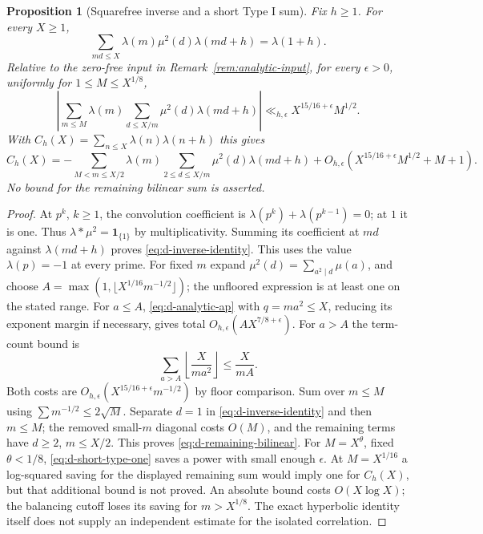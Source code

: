 \documentclass[11pt]{article}
\newtheorem{proposition}[theorem]{Proposition}
\theoremstyle{definition}
\newcommand{\ind}{\mathbf 1}
\theoremstyle{remark}
\numberwithin{equation}{section}
\begin{document}
\begin{proposition}[Squarefree inverse and a short Type I sum]\label{prop:d-inverse}
Fix $h\ge1$. For every $X\ge1$,
\begin{equation}\label{eq:d-inverse-identity}
 \sum_{md\le X}\lambda(m)\mu^2(d)\lambda(md+h)=\lambda(1+h).
\end{equation}
Relative to the zero-free input in Remark~\ref{rem:analytic-input}, for every $\epsilon>0$,
uniformly for $1\le M\le X^{1/8}$,
\begin{equation}\label{eq:d-short-type-one}
 \left|\sum_{m\le M}\lambda(m)\sum_{d\le X/m}\mu^2(d)\lambda(md+h)\right|
 \ll_{h,\epsilon}X^{15/16+\epsilon}M^{1/2}.
\end{equation}
With $C_h(X)=\sum_{n\le X}\lambda(n)\lambda(n+h)$ this gives
\begin{equation}\label{eq:d-remaining-bilinear}
 C_h(X)=-\sum_{M<m\le X/2}\lambda(m)
 \sum_{2\le d\le X/m}\mu^2(d)\lambda(md+h)
 +O_{h,\epsilon}(X^{15/16+\epsilon}M^{1/2}+M+1).
\end{equation}
No bound for the remaining bilinear sum is asserted.
\end{proposition}
\begin{proof}
At $p^k$, $k\ge1$, the convolution coefficient is
$\lambda(p^k)+\lambda(p^{k-1})=0$; at $1$ it is one. Thus
$\lambda*\mu^2=\ind_{\{1\}}$ by multiplicativity. Summing its coefficient at $md$ against
$\lambda(md+h)$ proves \eqref{eq:d-inverse-identity}. This uses the value $\lambda(p)=-1$ at every prime.
For fixed $m$ expand $\mu^2(d)=\sum_{a^2\mid d}\mu(a)$, and choose
$A=\max(1,\lfloor X^{1/16}m^{-1/2}\rfloor)$; the unfloored expression is at least one on the stated range.
For $a\le A$, \eqref{eq:d-analytic-ap} with $q=ma^2\le X$, reducing its exponent margin if necessary,
gives total $O_{h,\epsilon}(AX^{7/8+\epsilon})$.
For $a>A$ the term-count bound is
\begin{equation}\label{eq:d-squarefree-tail}
 \sum_{a>A}\left\lfloor\frac X{ma^2}\right\rfloor\le\frac X{mA}.
\end{equation}
Both costs are $O_{h,\epsilon}(X^{15/16+\epsilon}m^{-1/2})$ by floor comparison.
Sum over $m\le M$ using $\sum m^{-1/2}\le2\sqrt M$.
Separate $d=1$ in \eqref{eq:d-inverse-identity} and then $m\le M$; the removed small-$m$ diagonal
costs $O(M)$, and the remaining terms have $d\ge2$, $m\le X/2$.
This proves \eqref{eq:d-remaining-bilinear}.
For $M=X^\theta$, fixed $\theta<1/8$, \eqref{eq:d-short-type-one} saves a power with small enough
$\epsilon$. At $M=X^{1/16}$ a log-squared saving for the displayed remaining sum would imply one for
$C_h(X)$, but that additional bound is not proved. An absolute bound costs $O(X\log X)$; the balancing
cutoff loses its saving for $m>X^{1/8}$. The exact hyperbolic identity itself does not supply an
independent estimate for the isolated correlation.
\end{proof}
\end{document}
